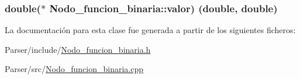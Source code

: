 \subsubsection[{\texorpdfstring{valor}{valor}}]{\setlength{\rightskip}{0pt plus 5cm}double($\ast$ Nodo\+\_\+funcion\+\_\+binaria\+::valor) (double, double)}\hypertarget{class_nodo__funcion__binaria_a1ec2b5d955b3c91bc1cc56447d9d9034}{}\label{class_nodo__funcion__binaria_a1ec2b5d955b3c91bc1cc56447d9d9034}


La documentación para esta clase fue generada a partir de los siguientes ficheros\+:\begin{DoxyCompactItemize}
\item 
Parser/include/\hyperlink{_nodo__funcion__binaria_8h}{Nodo\+\_\+funcion\+\_\+binaria.\+h}\item 
Parser/src/\hyperlink{_nodo__funcion__binaria_8cpp}{Nodo\+\_\+funcion\+\_\+binaria.\+cpp}\end{DoxyCompactItemize}
